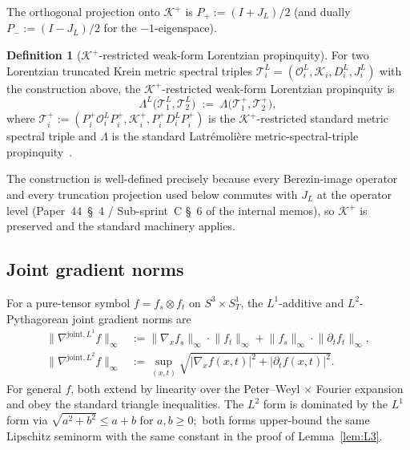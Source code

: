 \documentclass[11pt,a4paper]{article}
\theoremstyle{plain}
\theoremstyle{definition}
\newtheorem{definition}[theorem]{Definition}
\newcommand{\Manifold}{S^{3}\times S^{1}_{T}}
\newcommand{\Krein}{\mathcal{K}}
\newcommand{\Op}{\mathcal{O}}
\newcommand{\Tcal}{\mathcal{T}}
\newcommand{\norm}[1]{\lVert #1 \rVert}
\newcommand{\JL}{J_{L}}
\newcommand{\Lprop}{\Lambda^{L}}
\newcommand{\Lambdab}{\Lambda}
\newcommand{\Kplus}{\Krein^{+}}
\newcommand{\Pplus}{P_{+}}
\newcommand{\Pminus}{P_{-}}
\begin{document}
The orthogonal projection onto $\Kplus$ is $\Pplus := (I + \JL)/2$
(and dually $\Pminus := (I - \JL)/2$ for the $-1$-eigenspace).

\begin{definition}[$\Kplus$-restricted weak-form Lorentzian propinquity]
\label{def:weak_form_propinquity}
For two Lorentzian truncated Krein metric spectral triples
$\Tcal^{L}_{i} = (\Op^{L}_{i}, \Krein_{i}, D^{L}_{i}, J^{L}_{i})$ with
the construction above, the $\Kplus$-restricted weak-form Lorentzian
propinquity is
\begin{equation}\label{eq:weak_form_propinquity_def}
   \Lprop\bigl(\Tcal^{L}_{1}, \Tcal^{L}_{2}\bigr)
   \;:=\; \Lambdab\bigl(\Tcal^{+}_{1}, \Tcal^{+}_{2}\bigr),
\end{equation}
where $\Tcal^{+}_{i} := (P^{+}_{i} \Op^{L}_{i} P^{+}_{i}, \Krein^{+}_{i},
P^{+}_{i} D^{L}_{i} P^{+}_{i})$ is the $\Kplus$-restricted standard
metric spectral triple and $\Lambdab$ is the standard
Latr\'emoli\`ere metric-spectral-triple
propinquity~\cite{latremoliere_metric_st_2017}.
\end{definition}

The construction is well-defined precisely because every Berezin-image
operator and every truncation projection used below commutes with
$\JL$ at the operator level (Paper~44~\S~4 / Sub-sprint~C
\S~6 of the internal memos), so $\Kplus$ is preserved and the standard
machinery applies.

\subsection{Joint gradient norms}\label{sec:gradient_norms}

For a pure-tensor symbol $f = f_{s} \otimes f_{t}$ on $\Manifold$,
the $L^{1}$-additive and $L^{2}$-Pythagorean joint gradient norms are
\begin{align}
   \norm{\nabla^{\mathrm{joint}, L^{1}} f}_{\infty}
   &:= \norm{\nabla_{x} f_{s}}_{\infty} \cdot \norm{f_{t}}_{\infty}
     + \norm{f_{s}}_{\infty} \cdot \norm{\partial_{t} f_{t}}_{\infty},
   \label{eq:joint_L1} \\
   \norm{\nabla^{\mathrm{joint}, L^{2}} f}_{\infty}
   &:= \sup_{(x, t)} \sqrt{
        |\nabla_{x} f(x, t)|^{2} + |\partial_{t} f(x, t)|^{2}}.
   \label{eq:joint_L2}
\end{align}
For general $f$, both extend by linearity over the Peter--Weyl
$\times$ Fourier expansion and obey the standard triangle inequalities.
The $L^{2}$ form is dominated by the $L^{1}$ form via
$\sqrt{a^{2} + b^{2}} \le a + b$ for $a, b \ge 0$;\ both forms
upper-bound the same Lipschitz seminorm with the same constant in the
proof of Lemma~\ref{lem:L3}.
\end{document}
